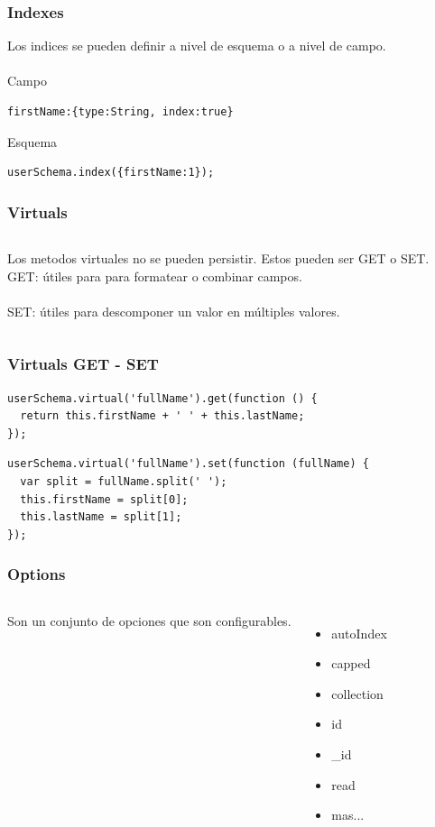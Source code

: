 \documentclass{beamer}
\begin{document}
\begin{frame}[fragile]
\frametitle{Indexes}
Los indices se pueden definir a nivel de esquema o a nivel de campo.
\\~\\
Campo
\begin{lstlisting}
firstName:{type:String, index:true}
\end{lstlisting}
Esquema
\begin{lstlisting}
userSchema.index({firstName:1});
\end{lstlisting}
\end{frame}

\begin{frame}
\frametitle{Virtuals}
\begin{columns}[c]
Los metodos virtuales no se pueden persistir. Estos pueden ser GET o SET.
GET: \'utiles para para formatear o combinar campos.
\\~\\
SET: \'utiles para descomponer un valor en m\'ultiples valores. 
\end{columns}
\end{frame}

\begin{frame}[fragile]
\frametitle{Virtuals GET - SET}
\medskip
\begin{lstlisting}
userSchema.virtual('fullName').get(function () {
  return this.firstName + ' ' + this.lastName;
});
\end{lstlisting}

\begin{lstlisting}
userSchema.virtual('fullName').set(function (fullName) {
  var split = fullName.split(' ');
  this.firstName = split[0];
  this.lastName = split[1];
});
\end{lstlisting}
\end{frame}

\begin{frame}
\frametitle{Options}
\begin{columns}[c]
Son un conjunto de opciones que son configurables.
\begin{itemize}[<+->]
\item autoIndex
\item capped
\item collection
\item id
\item \_id
\item read
\item mas...
\end{itemize}
\end{columns}
\end{frame}
\end{document}

